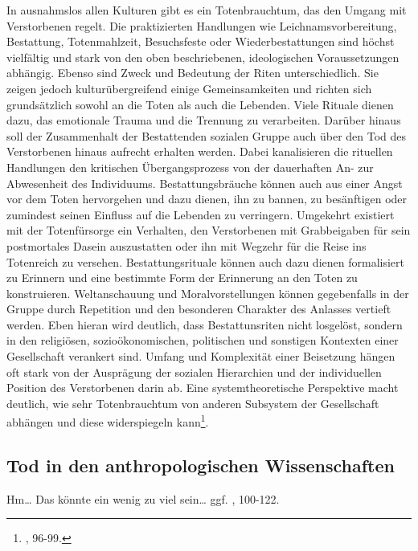 \documentclass[openany,twoside,twocolumn]{book}
\let\rmarkdownfootnote\footnote%
\def\footnote{\protect\rmarkdownfootnote}
\begin{document}
In ausnahmslos allen Kulturen gibt es ein Totenbrauchtum, das den Umgang
mit Verstorbenen regelt. Die praktizierten Handlungen wie
Leichnamsvorbereitung, Bestattung, Totenmahlzeit, Besuchsfeste oder
Wiederbestattungen sind höchst vielfältig und stark von den oben
beschriebenen, ideologischen Voraussetzungen abhängig. Ebenso sind Zweck
und Bedeutung der Riten unterschiedlich. Sie zeigen jedoch
kulturübergreifend einige Gemeinsamkeiten und richten sich grundsätzlich
sowohl an die Toten als auch die Lebenden. Viele Rituale dienen dazu,
das emotionale Trauma und die Trennung zu verarbeiten. Darüber hinaus
soll der Zusammenhalt der Bestattenden sozialen Gruppe auch über den Tod
des Verstorbenen hinaus aufrecht erhalten werden. Dabei kanalisieren die
rituellen Handlungen den kritischen Übergangsprozess von der dauerhaften
An- zur Abwesenheit des Individuums. Bestattungsbräuche können auch aus
einer Angst vor dem Toten hervorgehen und dazu dienen, ihn zu bannen, zu
besänftigen oder zumindest seinen Einfluss auf die Lebenden zu
verringern. Umgekehrt existiert mit der Totenfürsorge ein Verhalten, den
Verstorbenen mit Grabbeigaben für sein postmortales Dasein auszustatten
oder ihn mit Wegzehr für die Reise ins Totenreich zu versehen.
Bestattungsrituale können auch dazu dienen formalisiert zu Erinnern und
eine bestimmte Form der Erinnerung an den Toten zu konstruieren.
Weltanschauung und Moralvorstellungen können gegebenfalls in der Gruppe
durch Repetition und den besonderen Charakter des Anlasses vertieft
werden. Eben hieran wird deutlich, dass Bestattunsriten nicht losgelöst,
sondern in den religiösen, sozioökonomischen, politischen und sonstigen
Kontexten einer Gesellschaft verankert sind. Umfang und Komplexität
einer Beisetzung hängen oft stark von der Ausprägung der sozialen
Hierarchien und der individuellen Position des Verstorbenen darin ab.
Eine systemtheoretische Perspektive macht deutlich, wie sehr
Totenbrauchtum von anderen Subsystem der Gesellschaft abhängen und diese
widerspiegeln kann\footnote{\textcite{hofmann_rituelle_2008}, 96-99.}.

\hypertarget{tod-in-den-anthropologischen-wissenschaften}{%
\subsection{Tod in den anthropologischen
Wissenschaften}\label{tod-in-den-anthropologischen-wissenschaften}}

Hm\ldots{} Das könnte ein wenig zu viel sein\ldots{} ggf.
\textcite{hofmann_rituelle_2008}, 100-122.
\end{document}
